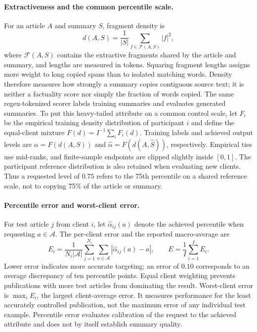 \documentclass[11pt]{article}
\begin{document}
\paragraph{Extractiveness and the common percentile scale.}
For an article $A$ and summary $S$, fragment density is
\begin{equation}
 d(A,S)=\frac{1}{|S|}\sum_{f\in\mathcal F(A,S)}|f|^2,
\end{equation}
where $\mathcal F(A,S)$ contains the extractive fragments shared by the article and summary, and lengths are measured in tokens. Squaring fragment lengths assigns more weight to long copied spans than to isolated matching words. Density therefore measures how strongly a summary copies contiguous source text; it is neither a factuality score nor simply the fraction of words copied. The same regex-tokenized scorer labels training summaries and evaluates generated summaries. To put this heavy-tailed attribute on a common control scale, let $F_i$ be the empirical training density distribution of participant $i$ and define the equal-client mixture $F(d)=I^{-1}\sum_i F_i(d)$. Training labels and achieved output levels are $\alpha=F(d(A,S))$ and $\widehat\alpha=F(d(A,\widehat S))$, respectively. Empirical ties use mid-ranks, and finite-sample endpoints are clipped slightly inside $[0,1]$. The participant reference distribution is also retained when evaluating new clients. Thus a requested level of $0.75$ refers to the 75th percentile on a shared reference scale, not to copying 75\% of the article or summary.

\paragraph{Percentile error and worst-client error.}
For test article $j$ from client $i$, let $\widehat\alpha_{ij}(a)$ denote the achieved percentile when requesting $a\in\mathcal A$. The per-client error and the reported macro-average are
\begin{equation}
 E_i=\frac{1}{N_i|\mathcal A|}\sum_{j=1}^{N_i}\sum_{a\in\mathcal A}
       |\widehat\alpha_{ij}(a)-a|,
 \qquad
 E=\frac{1}{I}\sum_{i=1}^{I}E_i.
\end{equation}
Lower error indicates more accurate targeting; an error of $0.10$ corresponds to an average discrepancy of ten percentile points. Equal client weighting prevents publications with more test articles from dominating the result. Worst-client error is $\max_i E_i$, the largest client-average error. It measures performance for the least accurately controlled publication, not the maximum error of any individual test example. Percentile error evaluates calibration of the request to the achieved attribute and does not by itself establish summary quality.
\end{document}
